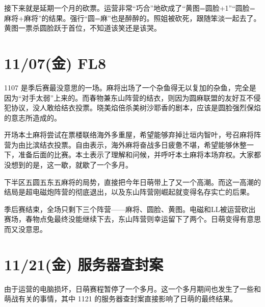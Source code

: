 接下来就是延期一个月的砍票。运营非常“巧合”地砍成了“黄图=圆脸+1”“圆脸=麻将+麻将”的结果。强行“圆=麻”也是醉醉的。照姐被砍死，跟随笨淡一起去了。黄图一票杀圆脸跃于首位，不知道该笑还是该哭。

\section{11/07(金) FL8}


1107 是季后赛最没意思的一场。麻将出场了一个杂鱼得无以复加的杂鱼，完全是因为“对手太弱”上来的。而春物兼东山阵营的结衣，则因为圆麻联盟的友好互不侵犯协议，没人敢给结衣投票。晓美焰倍杀美树沙耶香的剧本，应该是圆脸强烈保焰的意志所造成的。

开场本土麻将尝试在票楼联络海外多重屋，希望能够弃掉辻垣内智叶，号召麻将阵营为由比滨结衣投票。自由表示，海外麻将奋战多日疲惫不堪，希望能够休整一下，准备后面的比赛。本土表示了理解和问候，并呼吁本土麻将本场弃权。大家都没想到的是，这一歇，就歇了一个多月。

下半区五圆五东五麻将的局势，直接把今年日萌带上了又一个高潮。而这一高潮的结局是超电磁炮阵营的彻底退出，以及东山阵营刚崛起就变得名存实亡的后果。

季后赛结束，全场只剩下三个阵营——麻将、圆脸、黄图。电磁和LL被运营砍出赛场，春物点兔最终没能继续下去，东山阵营则幸运留下了两个。日萌变得有意思而又没意思。

\section{11/21(金) 服务器查封案}

由于运营的电脑损坏，日萌赛程暂停了一个多月。这一个多月期间也发生了一些和萌战有关的事情，其中 1121 的服务器查封案直接影响了日萌的最终结果。

